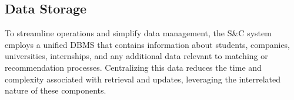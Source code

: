 \subsection{Data Storage}

To streamline operations and simplify data management, the S\&C system employs a unified DBMS that contains information about students, companies, universities, internships, and any additional data relevant to matching or recommendation processes. Centralizing this data reduces the time and complexity associated with retrieval and updates, leveraging the interrelated nature of these components.
